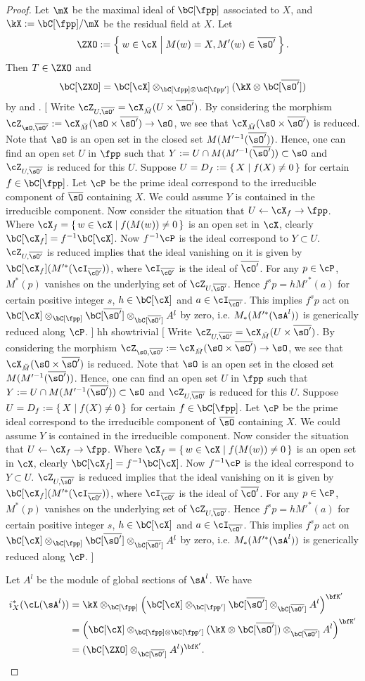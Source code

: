 \documentclass[12pt,a4paper]{amsart}
\newcommand{\trivial}[2][]{\if\relax\detokenize{#1}\relax
  {%
      \color{orange} \vspace{0em} $[$  #2 $]$
      \color{black}
  }
  \else
\ifx#1h
\ifcsname showtrivial\endcsname
{%
    \color{orange} \vspace{0em}  $[$ #2 $]$
    \color{black}
}
\fi
\else {\red Wrong argument!} \fi
\fi
}
\numberwithin{equation}{section}
\theoremstyle{remark}
\def\slift{\cL}
\def\bcOp{\overline{\cO'}}
\def\bsO{\overline{\sO}}
\def\bsOp{\overline{\sO'}}
\begin{document}
\begin{proof}
  Let $\mX$ be the maximal ideal of $\bC[\fpp]$ associated to $X$, and $\kX := \bC[\fpp]/\mX$
  be the residual field at $X$.
  Let
  \[
  \ZXO := \Set{w\in \cX|M(w) = X, M'(w)\in \bsOp}.
\]
Then $T\in \ZXO$ and
$$\bC[\ZXO] = \bC[\cX]\otimes_{\bC[\fpp]\otimes
  \bC[\fpp']}(\kX\otimes\bC[\bsOp])$$
  by  and
.
\trivial[h]{ Write
  $\cZ_{U,\bsOp} = \cX_{\breve{M}}(U\times \bsOp)$.  By considering the morphism
  $\cZ_{\sO,\bsOp}:=\cX_{\breve{M}}(\sO\times \bsOp) \rightarrow \sO$, we see
  that $\cX_{\breve{M}}(\sO\times \bsOp)$ is reduced. Note that $\sO$ is an open
  set in the closed set $M(M'^{-1}(\bsOp))$. Hence, one can find an open set $U$
  in $\fpp$ such that $Y:= U\cap M(M'^{-1}(\bsOp)) \subset \sO$ and
  $\cZ_{U, \bsOp}$ is reduced for this $U$.  Suppose
  $U = D_f := \set{X|f(X)\neq 0}$ for certain $f\in \bC[\fpp]$. Let $\cP$ be the
  prime ideal correspond to the irreducible component of $\bsO$ containing
  $X$. We could assume $Y$ is contained in the irreducible component.  Now
  consider the situation that $U \leftarrow \cX_f \rightarrow \fpp$. Where
  $\cX_f = \set{w \in \cX|f(M(w))\neq 0}$ is an open set in $\cX$, clearly
  $\bC[\cX_f] = f^{-1}\bC[\cX]$.  Now $f^{-1} \cP$ is the ideal correspond to
  $Y\subset U$.  $\cZ_{U,\bsOp}$ is reduced implies that the ideal vanishing on
  it is given by $\bC[\cX_f] (M'^*(\cI_{\bcOp}))$, where $\cI_{\bcOp}$ is the
  ideal of $\bcOp$. For any $p\in \cP$, $M^*(p)$ vanishes on the underlying set
  of $\cZ_{U,\bsOp}$. Hence $f^s p = h M'^*(a)$ for certain positive integer
  $s$, $h\in \bC[\cX]$ and $a \in \cI_{\bcOp}$. This implies $f^sp$ act on
  $\bC[\cX]\otimes_{\bC[\fpp]}\bC[\bsOp]\otimes_{\bC[\bsOp]}A^l$ by zero,
  i.e. $M_*(M'^*(\sA^l))$ is generically reduced along $\cP$. }


  Let  $A^l$ be the module of global sections of $\sA^l$. We have
  \[
    \begin{split}
      i^*_{X}(\slift(\sA^l)) &=
      \kX\otimes_{\bC[\fpp]}\left(\bC[\cX]\otimes_{\bC[\fpp']}\bC[\bsOp]\otimes_{\bC[\bsOp]}
        A^l\right)^{\bfK'}\\
      & = \left(\bC[\cX]\otimes_{\bC[\fpp]\otimes \bC[\fpp']}(\kX\otimes
        \bC[\bsOp])\otimes_{\bC[\bsOp]}A^l \right)^{\bfK'}\\
      & = (\bC[\ZXO]\otimes_{\bC[\bsOp]}A^l)^{\bfK'}.\\
    \end{split}
  \]


\end{proof}
\end{document}
